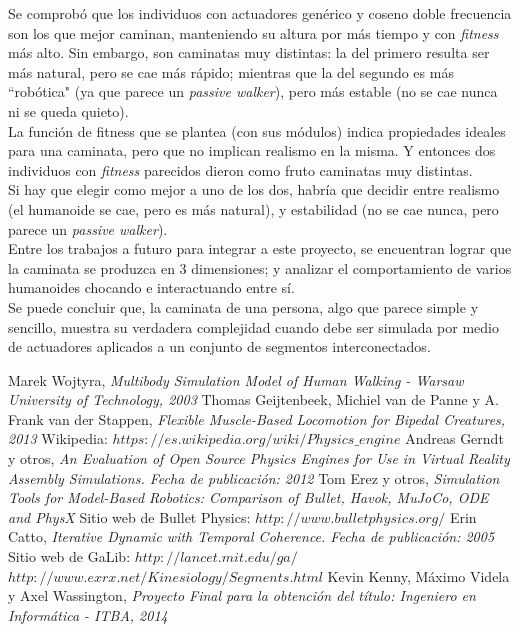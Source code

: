 \documentclass{article}
\begin{document}
Se comprob\'o que los individuos con actuadores gen\'erico y coseno doble frecuencia son los que mejor caminan, manteniendo su altura por m\'as tiempo y con \textit{fitness} m\'as alto. Sin embargo, son caminatas muy distintas: la del primero resulta ser m\'as natural, pero se cae m\'as r\'apido; mientras que la del segundo es m\'as ``rob\'otica" (ya que parece un \textit{passive walker}), pero m\'as estable (no se cae nunca ni se queda quieto).\\
La funci\'on de fitness que se plantea (con sus m\'odulos) indica propiedades ideales para una caminata, pero que no implican realismo en la misma. Y entonces dos individuos con \textit{fitness} parecidos dieron como fruto caminatas muy distintas.\\
Si hay que elegir como mejor a uno de los dos, habr\'ia que decidir entre realismo (el humanoide se cae, pero es m\'as natural), y estabilidad (no se cae nunca, pero parece un \textit{passive walker}).\\
Entre los trabajos a futuro para integrar a este proyecto, se encuentran lograr que la caminata se produzca en 3 dimensiones; y analizar el comportamiento de varios humanoides chocando e  interactuando entre s\'i.\\
Se puede concluir que, la caminata de una persona, algo que parece simple y sencillo, muestra su verdadera complejidad cuando debe ser simulada por medio de actuadores aplicados a un conjunto de segmentos interconectados.



\begin{thebibliography}{1}
Marek Wojtyra, \emph{Multibody Simulation Model of Human Walking - Warsaw University of Technology, 2003}
Thomas Geijtenbeek, Michiel van de Panne y A. Frank van der Stappen, \emph{Flexible Muscle-Based Locomotion for Bipedal Creatures, 2013 }
 Wikipedia: $https://es.wikipedia.org/wiki/Physics\_engine$
Andreas Gerndt y otros, \emph{An Evaluation of Open Source Physics Engines for Use in Virtual Reality Assembly Simulations. Fecha de publicaci\'on: 2012}
Tom Erez y otros, \emph{Simulation Tools for Model-Based Robotics: Comparison of \textit{Bullet}, Havok, MuJoCo, ODE and PhysX}
 Sitio web de Bullet Physics: $http://www.bulletphysics.org/$
Erin Catto, \emph{Iterative Dynamic with Temporal Coherence. Fecha de publicaci\'on: 2005}
 Sitio web de GaLib: $http://lancet.mit.edu/ga/$
 $http://www.exrx.net/Kinesiology/Segments.html$
Kevin Kenny, M\'aximo Videla y Axel Wassington, \emph{Proyecto Final para la obtenci\'on del t\'itulo: Ingeniero en Inform\'atica - ITBA, 2014}
\end{thebibliography}

\end{document}
